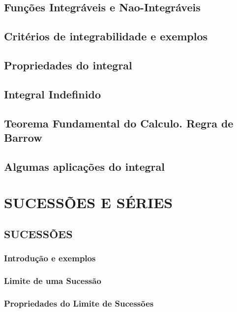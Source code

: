 \documentclass[11pt]{article}
\begin{document}
\subsection{Funções Integráveis e Nao-Integráveis}

\subsection{Critérios de integrabilidade e exemplos}

\subsection{Propriedades do integral}

\subsection{Integral Indefinido}

\subsection{Teorema Fundamental do Calculo. Regra de Barrow}

\subsection{Algumas aplicações do integral}



\newpage

\section{\MakeUppercase{Sucessões e Séries}}

\subsection{\MakeUppercase{Sucessões}}

\subsubsection{Introdução e exemplos}

\subsubsection{Limite de uma Sucessão}

\subsubsection{Propriedades do Limite de Sucessões}
\end{document}
